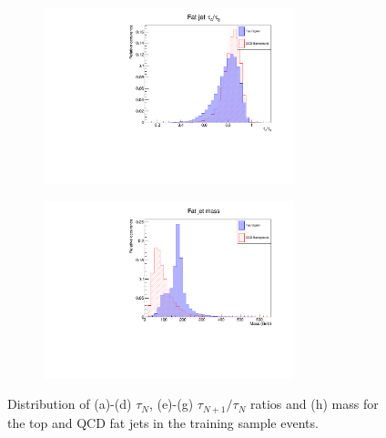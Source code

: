 \documentclass[main]{subfiles} %
\begin{document}
\begin{figure}[H]
\begin{subfigure}[h]{0.49\textwidth}
          \caption{}
         \label{fig:top_distribution_tau32}
     \end{subfigure}
     \par\bigskip 
     \begin{subfigure}[h]{0.49\textwidth}
         \centering
         \includegraphics[width=0.8\textwidth]{../Figures/Results/top_distributions/top_tau43_distribution.pdf}
          \caption{}
         \label{fig:top_distribution_tau43}
     \end{subfigure}
     \begin{subfigure}[h]{0.49\textwidth}
         \centering
         \includegraphics[width=0.8\textwidth]{../Figures/Results/top_distributions/top_mass_distribution.pdf}
          \caption{}
         \label{fig:top_distribution_mass}
     \end{subfigure}
     \caption{Distribution of (a)\;-\;(d) $\tau_N$, (e)\;-\;(g) $\tau_{N+1}/\tau_N$ ratios and (h) mass for the top and QCD fat jets in the training sample events.}
        \label{fig:top_distributions}
\end{figure}
\end{document}
